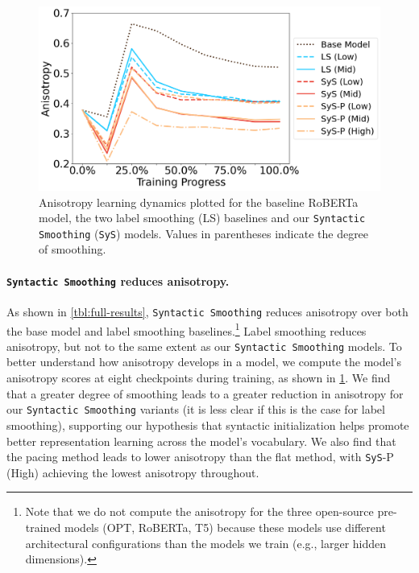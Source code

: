 \begin{figure}[ht!]
    \centering
    \includegraphics[width=\linewidth]{chapters/syntatic-smoothing/figures/anisotropy-learning-dynamics.png}
    \caption{Anisotropy learning dynamics plotted for the baseline RoBERTa model, the two label smoothing (LS) baselines and our \texttt{Syntactic Smoothing} (\texttt{SyS}) models. Values in parentheses indicate the degree of smoothing.}
    \label{fig:anisotropy-learing-dynamics}
    \vspace{-1em}
\end{figure}

\paragraph{\texttt{Syntactic Smoothing} reduces anisotropy.}

As shown in \cref{tbl:full-results}, \texttt{Syntactic Smoothing} reduces anisotropy over both the base model and label smoothing baselines.\footnote{Note that we do not compute the anisotropy for the three open-source pre-trained models (OPT, RoBERTa, T5) because these models use different architectural configurations than the models we train (e.g., larger hidden dimensions).} Label smoothing reduces anisotropy, but not to the same extent as our \texttt{Syntactic Smoothing} models. To better understand how anisotropy develops in a model, we compute the model's anisotropy scores at eight checkpoints during training, as shown in \cref{fig:anisotropy-learing-dynamics}. We find that a greater degree of smoothing leads to a greater reduction in anisotropy for our \texttt{Syntactic Smoothing} variants (it is less clear if this is the case for label smoothing), supporting our hypothesis that syntactic initialization helps promote better representation learning across the model's vocabulary. We also find that the pacing method leads to lower anisotropy than the flat method, with \texttt{SyS}-P (High) achieving the lowest anisotropy throughout.


